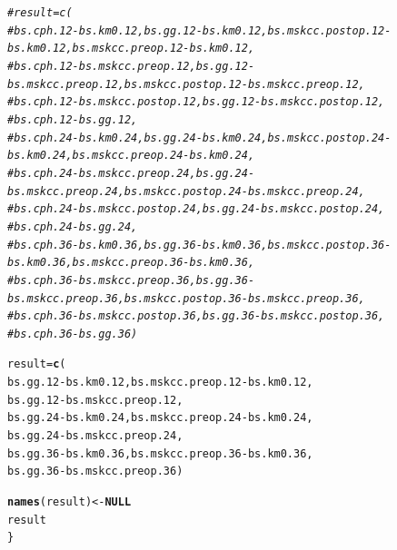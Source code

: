 \documentclass{article}\usepackage[]{graphicx}\usepackage[]{color}
\makeatletter
\newcommand{\hlcom}[1]{\textcolor[rgb]{0.678,0.584,0.686}{\textit{#1}}}%
\newcommand{\hlopt}[1]{\textcolor[rgb]{0,0,0}{#1}}%
\newcommand{\hlstd}[1]{\textcolor[rgb]{0.345,0.345,0.345}{#1}}%
\newcommand{\hlkwa}[1]{\textcolor[rgb]{0.161,0.373,0.58}{\textbf{#1}}}%
\newcommand{\hlkwb}[1]{\textcolor[rgb]{0.69,0.353,0.396}{#1}}%
\newcommand{\hlkwd}[1]{\textcolor[rgb]{0.737,0.353,0.396}{\textbf{#1}}}%
\newenvironment{kframe}{%
 \def\at@end@of@kframe{}%
 \ifinner\ifhmode%
  \def\at@end@of@kframe{\end{minipage}}%
  \begin{minipage}{\columnwidth}%
 \fi\fi%
 \def\FrameCommand##1{\hskip\@totalleftmargin \hskip-\fboxsep
 \colorbox{shadecolor}{##1}\hskip-\fboxsep
     \hskip-\linewidth \hskip-\@totalleftmargin \hskip\columnwidth}%
 \MakeFramed {\advance\hsize-\width
   \@totalleftmargin\z@ \linewidth\hsize
   \@setminipage}}%
 {\par\unskip\endMakeFramed%
 \at@end@of@kframe}
\newenvironment{knitrout}{}{} %
\makeatother
\begin{document}
\begin{knitrout}
\begin{kframe}
\begin{alltt}
        \hlcom{# result = c(}
        \hlcom{# 	bs.cph.12 - bs.km0.12, 			bs.gg.12 - bs.km0.12, 			bs.mskcc.postop.12 - bs.km0.12, 		bs.mskcc.preop.12 - bs.km0.12, }
        \hlcom{# 	bs.cph.12 - bs.mskcc.preop.12, 	bs.gg.12 - bs.mskcc.preop.12, 	bs.mskcc.postop.12 - bs.mskcc.preop.12, }
        \hlcom{# 	bs.cph.12 - bs.mskcc.postop.12, bs.gg.12 - bs.mskcc.postop.12,}
        \hlcom{# 	bs.cph.12 - bs.gg.12,}
        \hlcom{# 	bs.cph.24 - bs.km0.24, 			bs.gg.24 - bs.km0.24, 			bs.mskcc.postop.24 - bs.km0.24, 		bs.mskcc.preop.24 - bs.km0.24, }
        \hlcom{# 	bs.cph.24 - bs.mskcc.preop.24, 	bs.gg.24 - bs.mskcc.preop.24, 	bs.mskcc.postop.24 - bs.mskcc.preop.24, }
        \hlcom{# 	bs.cph.24 - bs.mskcc.postop.24, bs.gg.24 - bs.mskcc.postop.24,}
        \hlcom{# 	bs.cph.24 - bs.gg.24,}
        \hlcom{# 	bs.cph.36 - bs.km0.36, 			bs.gg.36 - bs.km0.36, 			bs.mskcc.postop.36 - bs.km0.36, 		bs.mskcc.preop.36 - bs.km0.36, }
        \hlcom{# 	bs.cph.36 - bs.mskcc.preop.36, 	bs.gg.36 - bs.mskcc.preop.36, 	bs.mskcc.postop.36 - bs.mskcc.preop.36, }
        \hlcom{# 	bs.cph.36 - bs.mskcc.postop.36, bs.gg.36 - bs.mskcc.postop.36,}
        \hlcom{# 	bs.cph.36 - bs.gg.36)}

        \hlstd{result} \hlkwb{=} \hlkwd{c}\hlstd{(}
                \hlstd{bs.gg.12} \hlopt{-} \hlstd{bs.km0.12,                   bs.mskcc.preop.12} \hlopt{-} \hlstd{bs.km0.12,}
                \hlstd{bs.gg.12} \hlopt{-} \hlstd{bs.mskcc.preop.12,}
                \hlstd{bs.gg.24} \hlopt{-} \hlstd{bs.km0.24,                   bs.mskcc.preop.24} \hlopt{-} \hlstd{bs.km0.24,}
                \hlstd{bs.gg.24} \hlopt{-} \hlstd{bs.mskcc.preop.24,}
                \hlstd{bs.gg.36} \hlopt{-} \hlstd{bs.km0.36,                   bs.mskcc.preop.36} \hlopt{-} \hlstd{bs.km0.36,}
                \hlstd{bs.gg.36} \hlopt{-} \hlstd{bs.mskcc.preop.36)}

        \hlkwd{names}\hlstd{(result)} \hlkwb{<-} \hlkwa{NULL}
        \hlstd{result}
\hlstd{\}}


\end{alltt}
\end{kframe}
\end{knitrout}
\end{document}
